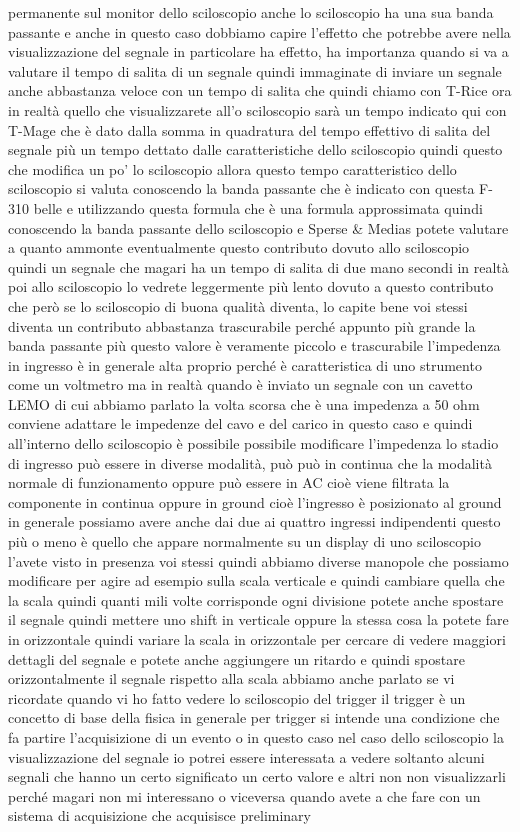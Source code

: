 permanente sul monitor dello sciloscopio anche lo sciloscopio ha una sua banda passante e anche in questo caso dobbiamo capire l'effetto che potrebbe avere nella visualizzazione del segnale in particolare ha effetto, ha importanza quando si va a valutare il tempo di salita di un segnale quindi immaginate di inviare un segnale anche abbastanza veloce con un tempo di salita che quindi chiamo con T-Rice ora in realtà quello che visualizzarete all'o sciloscopio sarà un tempo indicato qui con T-Mage che è dato dalla somma in quadratura del tempo effettivo di salita del segnale più un tempo dettato dalle caratteristiche dello sciloscopio quindi questo che modifica un po' lo sciloscopio allora questo tempo caratteristico dello sciloscopio si valuta conoscendo la banda passante che è indicato con questa F-310 belle e utilizzando questa formula che è una formula approssimata quindi conoscendo la banda passante dello sciloscopio e Sperse \& Medias potete valutare a quanto ammonte eventualmente questo contributo dovuto allo sciloscopio quindi un segnale che magari ha un tempo di salita di due mano secondi in realtà poi allo sciloscopio lo vedrete leggermente più lento dovuto a questo contributo che però se lo sciloscopio di buona qualità diventa, lo capite bene voi stessi diventa un contributo abbastanza trascurabile perché appunto più grande la banda passante più questo valore è veramente piccolo e trascurabile l'impedenza in ingresso è in generale alta proprio perché è caratteristica di uno strumento come un voltmetro ma in realtà quando è inviato un segnale con un cavetto LEMO di cui abbiamo parlato la volta scorsa che è una impedenza a 50 ohm conviene adattare le impedenze del cavo e del carico in questo caso e quindi all'interno dello sciloscopio è possibile possibile modificare l'impedenza lo stadio di ingresso può essere in diverse modalità, può può in continua che la modalità normale di funzionamento oppure può essere in AC cioè viene filtrata la componente in continua oppure in ground cioè l'ingresso è posizionato al ground in generale possiamo avere anche dai due ai quattro ingressi indipendenti questo più o meno è quello che appare normalmente su un display di uno sciloscopio l'avete visto in presenza voi stessi quindi abbiamo diverse manopole che possiamo modificare per agire ad esempio sulla scala verticale e quindi cambiare quella che la scala quindi quanti mili volte corrisponde ogni divisione potete anche spostare il segnale quindi mettere uno shift in verticale oppure la stessa cosa la potete fare in orizzontale quindi variare la scala in orizzontale per cercare di vedere maggiori dettagli del segnale e potete anche aggiungere un ritardo e quindi spostare orizzontalmente il segnale rispetto alla scala abbiamo anche parlato se vi ricordate quando vi ho fatto vedere lo sciloscopio del trigger il trigger è un concetto di base della fisica in generale per trigger si intende una condizione che fa partire l'acquisizione di un evento o in questo caso nel caso dello sciloscopio la visualizzazione del segnale io potrei essere interessata a vedere soltanto alcuni segnali che hanno un certo significato un certo valore e altri non non visualizzarli perché magari non mi interessano o viceversa quando avete a che fare con un sistema di acquisizione che acquisisce preliminary 